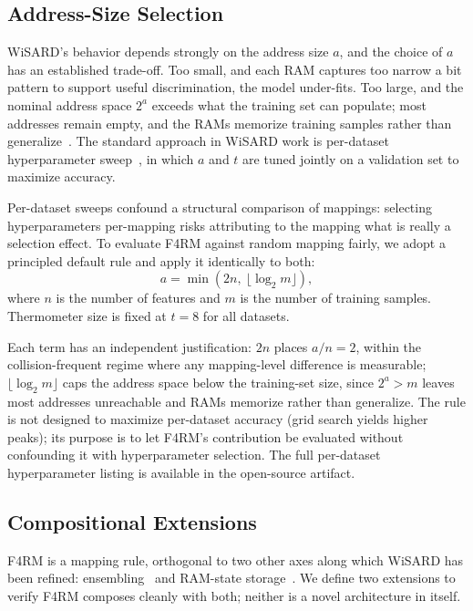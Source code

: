 \subsection{Address-Size Selection}
\label{sec:f4rm-address}

WiSARD's behavior depends strongly on the address size $a$, and the choice of $a$ has an established trade-off. Too small, and each RAM captures too narrow a bit pattern to support useful discrimination, the model under-fits. Too large, and the nominal address space $2^a$ exceeds what the training set can populate; most addresses remain empty, and the RAMs memorize training samples rather than generalize~\cite{susskind2022bthowen}. The standard approach in WiSARD work is per-dataset hyperparameter sweep~\cite{susskind2022bthowen}, in which $a$ and $t$ are tuned jointly on a validation set to maximize accuracy.

Per-dataset sweeps confound a structural comparison of mappings: selecting hyperparameters per-mapping risks attributing to the mapping what is really a selection effect. To evaluate F4RM against random mapping fairly, we adopt a principled default rule and apply it identically to both:
\begin{equation}
a = \min\left(2n,\ \lfloor \log_2 m \rfloor\right),
\label{eq:address-size}
\end{equation}
where $n$ is the number of features and $m$ is the number of training samples. Thermometer size is fixed at $t = 8$ for all datasets.

Each term has an independent justification: $2n$ places $a/n = 2$, within the collision-frequent regime where any mapping-level difference is measurable; $\lfloor \log_2 m \rfloor$ caps the address space below the training-set size, since $2^a > m$ leaves most addresses unreachable and RAMs memorize rather than generalize. The rule is not designed to maximize per-dataset accuracy (grid search yields higher peaks); its purpose is to let F4RM's contribution be evaluated without confounding it with hyperparameter selection. The full per-dataset hyperparameter listing is available in the open-source artifact.

\subsection{Compositional Extensions}
\label{sec:f4rm-extensions}

F4RM is a mapping rule, orthogonal to two other axes along which WiSARD has been refined: ensembling~\cite{susskind2023uleen,lusquino2021thesis} and RAM-state storage~\cite{santiago2020bloom,santiago2019thesis,susskind2023uleen}. We define two extensions to verify F4RM composes cleanly with both; neither is a novel architecture in itself.

